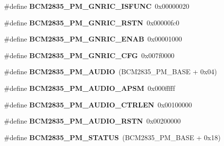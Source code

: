 \begin{DoxyCompactItemize}
\item 
\mbox{\label{group__raspberrypi__reg_ga6eb43b2551c0301fe81bf5c369590bf9}} 
\#define {\bfseries B\+C\+M2835\+\_\+\+P\+M\+\_\+\+G\+N\+R\+I\+C\+\_\+\+I\+S\+F\+U\+NC}~0x00000020
\item 
\mbox{\label{group__raspberrypi__reg_ga13050a3fc57d0e47bcf0079fca4909c6}} 
\#define {\bfseries B\+C\+M2835\+\_\+\+P\+M\+\_\+\+G\+N\+R\+I\+C\+\_\+\+R\+S\+TN}~0x00000fc0
\item 
\mbox{\label{group__raspberrypi__reg_gaf4a1ed3dc8106174c5fd1e043b661543}} 
\#define {\bfseries B\+C\+M2835\+\_\+\+P\+M\+\_\+\+G\+N\+R\+I\+C\+\_\+\+E\+N\+AB}~0x00001000
\item 
\mbox{\label{group__raspberrypi__reg_gacdc9c2dc8fd7180ae73ed47901f76dec}} 
\#define {\bfseries B\+C\+M2835\+\_\+\+P\+M\+\_\+\+G\+N\+R\+I\+C\+\_\+\+C\+FG}~0x007f0000
\item 
\mbox{\label{group__raspberrypi__reg_ga160b9795ae477449ed6822e763ebe3af}} 
\#define {\bfseries B\+C\+M2835\+\_\+\+P\+M\+\_\+\+A\+U\+D\+IO}~(B\+C\+M2835\+\_\+\+P\+M\+\_\+\+B\+A\+SE + 0x04)
\item 
\mbox{\label{group__raspberrypi__reg_ga1104b43cc3686277da21d51d431a13b8}} 
\#define {\bfseries B\+C\+M2835\+\_\+\+P\+M\+\_\+\+A\+U\+D\+I\+O\+\_\+\+A\+P\+SM}~0x000fffff
\item 
\mbox{\label{group__raspberrypi__reg_ga5b315444e22a49fb9b6236148b5f702f}} 
\#define {\bfseries B\+C\+M2835\+\_\+\+P\+M\+\_\+\+A\+U\+D\+I\+O\+\_\+\+C\+T\+R\+L\+EN}~0x00100000
\item 
\mbox{\label{group__raspberrypi__reg_gaaaae1241f9f05664f0d8b8daa6a344db}} 
\#define {\bfseries B\+C\+M2835\+\_\+\+P\+M\+\_\+\+A\+U\+D\+I\+O\+\_\+\+R\+S\+TN}~0x00200000
\item 
\mbox{\label{group__raspberrypi__reg_ga38fbda49c1116287e38d0fd320105c46}} 
\#define {\bfseries B\+C\+M2835\+\_\+\+P\+M\+\_\+\+S\+T\+A\+T\+US}~(B\+C\+M2835\+\_\+\+P\+M\+\_\+\+B\+A\+SE + 0x18)

\end{DoxyCompactItemize}
